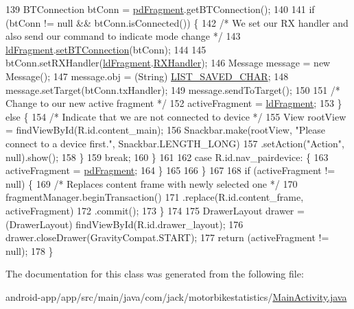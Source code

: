 \begin{DoxyCode}
139                 BTConnection btConn = \hyperlink{classcom_1_1jack_1_1motorbikestatistics_1_1_main_activity_a2802ad16b5fdba42834d1b31e255dd96}{pdFragment}.getBTConnection();
140 
141                 \textcolor{keywordflow}{if} (btConn != null && btConn.isConnected()) \{
142                     \textcolor{comment}{/* We set our RX handler and also send our command to indicate mode change */}
143                     \hyperlink{classcom_1_1jack_1_1motorbikestatistics_1_1_main_activity_ac2ac0c852d3352efd6368ee550ef3c3c}{ldFragment}.\hyperlink{classcom_1_1jack_1_1motorbikestatistics_1_1_load_device_fragment_aec66dc5fd944098de78ace4175fca5b6}{setBTConnection}(btConn);
144 
145                     btConn.setRXHandler(\hyperlink{classcom_1_1jack_1_1motorbikestatistics_1_1_main_activity_ac2ac0c852d3352efd6368ee550ef3c3c}{ldFragment}.\hyperlink{classcom_1_1jack_1_1motorbikestatistics_1_1_load_device_fragment_a7c26c8686c290d8766b051f31473d716}{RXHandler});
146                     Message message = \textcolor{keyword}{new} Message();
147                     message.obj = (String) \hyperlink{classcom_1_1jack_1_1motorbikestatistics_1_1_main_activity_a853e8df63cac245f60ef82edaaa7ee31}{LIST\_SAVED\_CHAR};
148                     message.setTarget(btConn.txHandler);
149                     message.sendToTarget();
150 
151                     \textcolor{comment}{/* Change to our new active fragment */}
152                     activeFragment = \hyperlink{classcom_1_1jack_1_1motorbikestatistics_1_1_main_activity_ac2ac0c852d3352efd6368ee550ef3c3c}{ldFragment};
153                 \} \textcolor{keywordflow}{else} \{
154                     \textcolor{comment}{/* Indicate that we are not connected to device */}
155                     View rootView = findViewById(R.id.content\_main);
156                     Snackbar.make(rootView, \textcolor{stringliteral}{"Please connect to a device first."}, Snackbar.LENGTH\_LONG)
157                             .setAction(\textcolor{stringliteral}{"Action"}, null).show();
158                 \}
159                 \textcolor{keywordflow}{break};
160             \}
161 
162             \textcolor{keywordflow}{case} R.id.nav\_pairdevice: \{
163                 activeFragment = \hyperlink{classcom_1_1jack_1_1motorbikestatistics_1_1_main_activity_a2802ad16b5fdba42834d1b31e255dd96}{pdFragment};
164             \}
165 
166         \}
167 
168         \textcolor{keywordflow}{if} (activeFragment != null) \{
169             \textcolor{comment}{/* Replaces content frame with newly selected one */}
170             fragmentManager.beginTransaction()
171                     .replace(R.id.content\_frame, activeFragment)
172                     .commit();
173         \}
174 
175         DrawerLayout drawer = (DrawerLayout) findViewById(R.id.drawer\_layout);
176         drawer.closeDrawer(GravityCompat.START);
177         \textcolor{keywordflow}{return} (activeFragment != null);
178     \}
\end{DoxyCode}


The documentation for this class was generated from the following file\+:\begin{DoxyCompactItemize}
\item 
android-\/app/app/src/main/java/com/jack/motorbikestatistics/\hyperlink{_main_activity_8java}{Main\+Activity.\+java}\end{DoxyCompactItemize}

